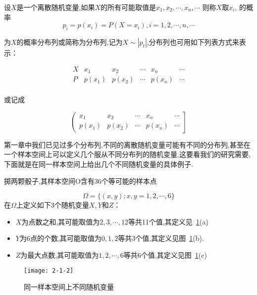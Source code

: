 \begin{definition}{}{}
	设$ X $是一个离散随机变量,如果$ X $的所有可能取值是$ x_1,x_{2}, \cdots, x_{n}, \cdots$ 则称$ X $取$ x_i $, 的概率
	\begin{equation} 
	p_{i}=p\left(x_{i}\right)=P\left(X=x_{i}\right), i=1,2, \cdots, n, \cdots \label{eq:2.1.2}
	\end{equation}
	
	为$ X $的概率分布列或简称为分布列,记为$X \sim\left|p_{t}\right|$,分布列也可用如下列表方式来表示：
	
	\[
	\begin{array}{c|ccccc}
	X	&    x_{1}     &    x_{2}     &    \cdots     &     x_{n}    &   \cdots \\
	P	&    p(x_1)     &    p(x_2)     &    \cdots     &    p(x_n)     &   \cdots \\
	\end{array}
	\]
	
	
	或记成
	
	\[ 
	\left( \begin{array}{ccccc}{x_{1}} & {x_{2}} & {\cdots} & {x_{n}} & {\cdots} \\ {p\left(x_{1}\right)} & {p\left(x_{2}\right)} & {\cdots} & {p\left(x_{n}\right)} & {\cdots}\end{array}\right]
	\]
	
\end{definition}


第一章中我们已见过多个分布列,不同的离散随机变量可能有不同的分布列,甚至在一个样本空间上可以定义几个服从不同分布列的随机变量,这要看我们的研究需要,下面就是在同一样本空间上给出几个不同随机变量的具体例子.
\begin{example}
	掷两颗骰子,其样本空间O含有36个等可能的样本点
	
	\[ 
	\Omega=\{(x, y) ; x, y=1,2, \cdots, 6\}
	\]
	在$ \Omega $上定义如下3个随机变量$ X,Y $和$ Z $：
	\begin{itemize}
		\item $ X $为点数之和,其可能取值为$2,3, \cdots, 12$等共11个值,其定义见~\ref{fig:2-1-2}(a)
		\item $ Y $为6点的个数,其可能取值为$ 0,1,2 $等共$ 3 $个值,其定义见图~\ref{fig:2-1-2}(b).
		\item $ Z $为最大点数,其可能取值为$1,2, \cdots, 6$等共$ 6 $个值,其定义见图~\ref{fig:2-1-2}(c)
	\end{itemize}
\end{example}


\begin{figure}
	\centering
	\texttt{[image: 2-1-2]}
	\caption{同一样本空间上不同随机变量}
	\label{fig:2-1-2}
\end{figure}

